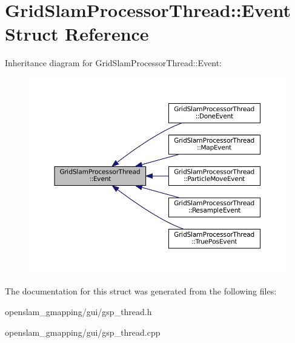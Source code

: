\hypertarget{structGridSlamProcessorThread_1_1Event}{}\section{Grid\+Slam\+Processor\+Thread\+:\+:Event Struct Reference}
\label{structGridSlamProcessorThread_1_1Event}


Inheritance diagram for Grid\+Slam\+Processor\+Thread\+:\+:Event\+:
\nopagebreak
\begin{figure}[H]
\begin{center}
\leavevmode
\includegraphics[width=350pt]{structGridSlamProcessorThread_1_1Event__inherit__graph}
\end{center}
\end{figure}


The documentation for this struct was generated from the following files\+:\begin{DoxyCompactItemize}
\item 
openslam\+\_\+gmapping/gui/gsp\+\_\+thread.\+h\item 
openslam\+\_\+gmapping/gui/gsp\+\_\+thread.\+cpp\end{DoxyCompactItemize}

